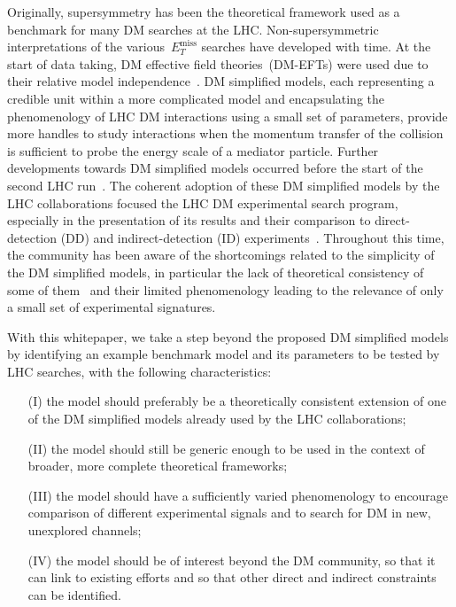 \documentclass[a4paper, 11pt,notoc]{article}
\newcommand{\MET}{\ensuremath{E_T^\mathrm{miss}}\xspace}
\begin{document}
Originally, supersymmetry has been the theoretical framework used as a benchmark for many DM searches at the LHC.  Non-supersymmetric interpretations of the various~$\MET$ searches have  developed with time. At the start of data taking, DM effective field theories~(DM-EFTs)  were used due to their relative model independence~\cite{Cao:2009uw,Beltran:2010ww,Goodman:2010yf,Bai:2010hh,Goodman:2010ku,Fox:2011pm}.  DM simplified models, each representing a credible unit within a more complicated model and encapsulating the phenomenology of LHC DM interactions using a small set of parameters, provide more handles to study interactions when the momentum transfer of the collision is sufficient to probe the energy scale of a mediator particle. Further developments towards DM simplified models occurred before the start of the second LHC run~\cite{Abdallah:2015ter,Abercrombie:2015wmb}.  The coherent adoption of these DM simplified models by the LHC collaborations focused the LHC DM experimental search program, especially in the presentation of its results and their comparison to direct-detection (DD) and indirect-detection (ID) experiments~\cite{Boveia:2016mrp,Albert:2017onk}.  Throughout this time, the community has been aware of the shortcomings related to the simplicity of the DM simplified models, in particular the lack of theoretical consistency of some of them~\cite{Chala:2015ama,Bell:2015sza,Kahlhoefer:2015bea,Bell:2015rdw,Haisch:2016usn,Englert:2016joy,Ko:2016zxg} and their limited phenomenology leading to the relevance of only a small set of experimental signatures.  

With this whitepaper, we take a step beyond the proposed DM simplified models by identifying an example benchmark model and its parameters to be tested by LHC searches, with the following characteristics: 
\begin{itemize}
\item[(I)] the model should preferably be a theoretically consistent extension of one of the DM simplified models already used by the LHC collaborations;
\item[(II)] the model should still be generic enough to be used in the context of broader, more complete theoretical frameworks;  
\item[(III)] the model should have a sufficiently varied phenomenology to encourage comparison of different experimental signals and to search for DM in new, unexplored channels;
\item[(IV)] the model should be of interest beyond the DM community, so that it can link to existing efforts and so that other direct and indirect constraints can be identified.
\end{itemize}
\end{document}

